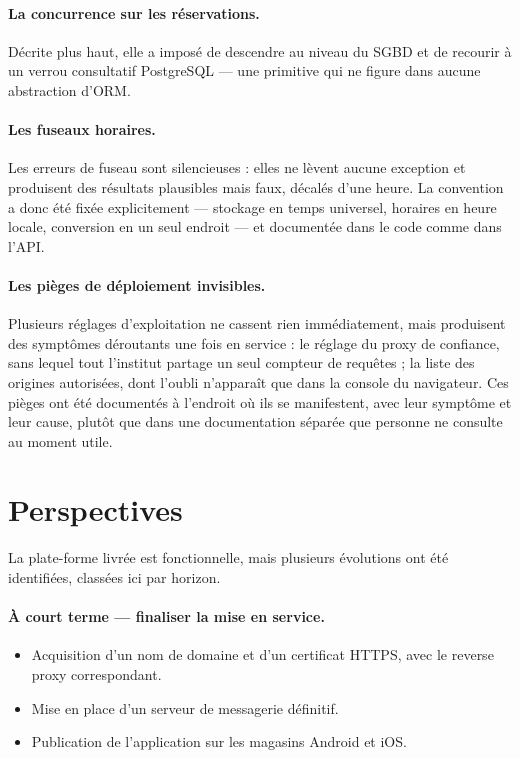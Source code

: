 \paragraph{La concurrence sur les réservations.} Décrite plus haut, elle a
imposé de descendre au niveau du SGBD et de recourir à un verrou consultatif
PostgreSQL --- une primitive qui ne figure dans aucune abstraction d'ORM.

\paragraph{Les fuseaux horaires.} Les erreurs de fuseau sont silencieuses :
elles ne lèvent aucune exception et produisent des résultats plausibles mais
faux, décalés d'une heure. La convention a donc été fixée explicitement ---
stockage en temps universel, horaires en heure locale, conversion en un seul
endroit --- et documentée dans le code comme dans l'API.

\paragraph{Les pièges de déploiement invisibles.} Plusieurs réglages
d'exploitation ne cassent rien immédiatement, mais produisent des symptômes
déroutants une fois en service : le réglage du proxy de confiance, sans lequel
tout l'institut partage un seul compteur de requêtes ; la liste des origines
autorisées, dont l'oubli n'apparaît que dans la console du navigateur. Ces
pièges ont été documentés à l'endroit où ils se manifestent, avec leur symptôme
et leur cause, plutôt que dans une documentation séparée que personne ne
consulte au moment utile.

\section*{Perspectives}

La plate-forme livrée est fonctionnelle, mais plusieurs évolutions ont été
identifiées, classées ici par horizon.

\paragraph{À court terme --- finaliser la mise en service.}
\begin{itemize}[leftmargin=1.2cm,nosep]
  \item Acquisition d'un nom de domaine et d'un certificat HTTPS, avec le
  reverse proxy correspondant.
  \item Mise en place d'un serveur de messagerie définitif.
  \item Publication de l'application sur les magasins Android et iOS.
\end{itemize}

